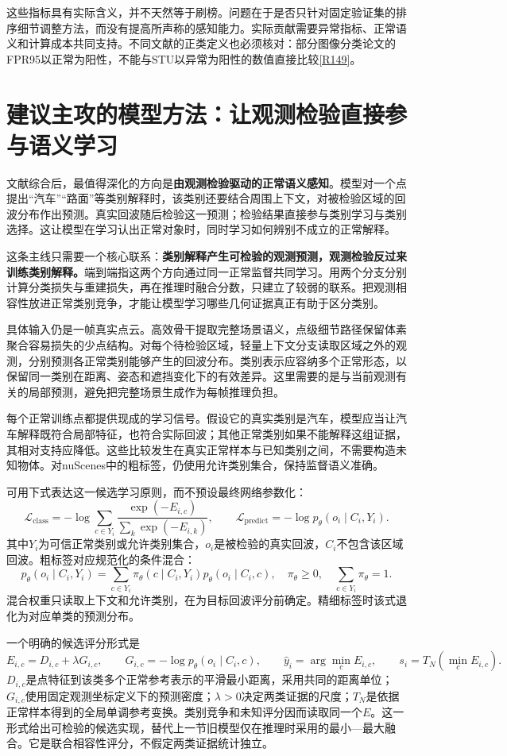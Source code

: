 \documentclass[11pt,a4paper]{article}
\newcommand{\paper}[1]{\allowbreak\hyperlink{#1}{[#1]}\allowbreak}
\begin{document}
这些指标具有实际含义，并不天然等于刷榜。问题在于是否只针对固定验证集的排序细节调整方法，而没有提高所声称的感知能力。实际贡献需要异常指标、正常语义和计算成本共同支持。不同文献的正类定义也必须核对：部分图像分类论文的FPR95以正常为阳性，不能与STU以异常为阳性的数值直接比较\paper{R149}。

\section{建议主攻的模型方法：让观测检验直接参与语义学习}

文献综合后，最值得深化的方向是\textbf{由观测检验驱动的正常语义感知}。模型对一个点提出“汽车”“路面”等类别解释时，该类别还要结合周围上下文，对被检验区域的回波分布作出预测。真实回波随后检验这一预测；检验结果直接参与类别学习与类别选择。这让模型在学习认出正常对象时，同时学习如何辨别不成立的正常解释。

这条主线只需要一个核心联系：\textbf{类别解释产生可检验的观测预测，观测检验反过来训练类别解释。}端到端指这两个方向通过同一正常监督共同学习。用两个分支分别计算分类损失与重建损失，再在推理时融合分数，只建立了较弱的联系。把观测相容性放进正常类别竞争，才能让模型学习哪些几何证据真正有助于区分类别。

具体输入仍是一帧真实点云。高效骨干提取完整场景语义，点级细节路径保留体素聚合容易损失的少点结构。对每个待检验区域，轻量上下文分支读取区域之外的观测，分别预测各正常类别能够产生的回波分布。类别表示应容纳多个正常形态，以保留同一类别在距离、姿态和遮挡变化下的有效差异。这里需要的是与当前观测有关的局部预测，避免把完整场景生成作为每帧推理负担。

每个正常训练点都提供现成的学习信号。假设它的真实类别是汽车，模型应当让汽车解释既符合局部特征，也符合实际回波；其他正常类别如果不能解释这组证据，其相对支持应降低。这些比较发生在真实正常样本与已知类别之间，不需要构造未知物体。对nuScenes中的粗标签，仍使用允许类别集合，保持监督语义准确。

可用下式表达这一候选学习原则，而不预设最终网络参数化：
\[
\mathcal L_{\mathrm{class}}
=-\log\!\sum_{c\in Y_i}
\frac{\exp(-E_{i,c})}{\sum_k\exp(-E_{i,k})},
\qquad
\mathcal L_{\mathrm{predict}}
=-\log p_\theta(o_i\mid C_i,Y_i).
\]
其中$Y_i$为可信正常类别或允许类别集合，$o_i$是被检验的真实回波，$C_i$不包含该区域回波。粗标签对应规范化的条件混合：
\[
p_\theta(o_i\mid C_i,Y_i)=\sum_{c\in Y_i}\pi_\theta(c\mid C_i,Y_i)p_\theta(o_i\mid C_i,c),
\quad \pi_\theta\geq0,\quad\sum_{c\in Y_i}\pi_\theta=1.
\]
混合权重只读取上下文和允许类别，在为目标回波评分前确定。精细标签时该式退化为对应单类的预测分布。

一个明确的候选评分形式是
\[
E_{i,c}=D_{i,c}+\lambda G_{i,c},\qquad
G_{i,c}=-\log p_\theta(o_i\mid C_i,c),\qquad
\hat y_i=\arg\min_c E_{i,c},\qquad
s_i=T_N(\min_c E_{i,c}).
\]
$D_{i,c}$是点特征到该类多个正常参考表示的平滑最小距离，采用共同的距离单位；$G_{i,c}$使用固定观测坐标定义下的预测密度；$\lambda>0$决定两类证据的尺度；$T_N$是依据正常样本得到的全局单调参考变换。类别竞争和未知评分因而读取同一个$E$。这一形式给出可检验的候选实现，替代上一节旧模型仅在推理时采用的最小—最大融合。它是联合相容性评分，不假定两类证据统计独立。
\end{document}
